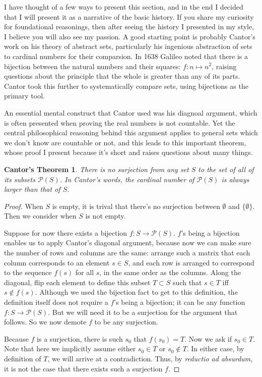\documentclass[10pt]{article}
\newtheorem*{CT}{Cantor's Theorem}
\begin{document}
I have thought of a few ways to present this section, and in the end I decided
that I will present it as a narrative of the basic history. If you share my
curiosity for foundational reasonings, then after seeing the history I
presented in my style, I believe you will also see my passion.  A good starting
point is probably Cantor's work on his theory of abstract sets, particularly
his ingenious abstraction of sets to cardinal numbers for their comparsion.  In
1638 Galileo noted that there is a bijection between the natural numbers and
their squares: $f : n \mapsto n^2$, raising questions about the principle that
the whole is greater than any of its parts. Cantor took this further to
systematically compare sets, using bijections as the primary tool. 

An essential mental construct that Cantor used was his diagnoal argument, which
is often presented when proving the real numbers is not countable. Yet the
central philosophical reasoning behind this argument applies to general sets
which we don't know are countable or not, and this leads to this important
theorem, whose proof I present because it's short and raises questions about
many things.
\begin{CT}
There is no surjection from any set $S$ to the set of all of its subsets
$\mathcal{P}(S)$. In Cantor's words, the cardinal number of $\mathcal{P}(S)$ is
always larger than that of $S$.
\end{CT}
\begin{proof}
When $S$ is empty, it is trival that there's no surjection between $\emptyset$
and $\{\emptyset\}$. Then we consider when $S$ is not empty.

Suppose for now there exists a bijection $f : S \to
\mathcal{P}(S)$. $f$'s being a bijection enables us to apply Cantor's
diagonal argument, because now we can make sure the number of rows and columns
are the same: arrange such a matrix that each column corresponds to an element
$s \in S$, and each row is arranged to correspond to the sequence $f(s)$ for
all $s$, in the same order as the columns. Along the diagonal, flip each
element to define this subset $T \subset S$ such that $s \in T$ iff $s \notin
f(s)$. Although we used the bijection fact to get to this definition, the
definition itself does not require a $f$'s being a bijection; it can be any
function $f : S \to \mathcal{P}(S)$. But we will need it to be a surjection for
the argument that follows. So we now demote $f$ to be any surjection.

Because $f$ is a surjection, there is such $s_0$ that $f(s_0) = T$. Now we ask
if $s_0 \in T$. Note that here we implicitly assume either $s_0 \in T$ or $s_0
\notin T$. In either case, by definition of $T$, we will arrive at a
contradiction. Thus, by \emph{reductio ad absurdum}, it is not the case
that there exists such a surjection $f$.
\end{proof}
\end{document}
